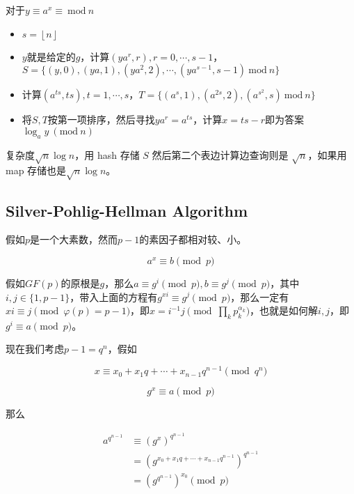 \documentclass{article}
\begin{document}
对于$y\equiv a^x\equiv~\mathrm{mod}~n$

\begin{itemize}
    \item $s=\left\lfloor n\right\rfloor$
    \item $y$就是给定的$g$，计算$(ya^r,r),r=0,\cdots,s-1$，$S=\{(y,0),(ya,1),(ya^2,2),\cdots,(ya^{s-1},s-1)~\mathrm{mod}~n\}$
    \item 计算$(a^{ts},ts),t=1,\cdots,s$，$T=\{(a^s,1),(a^{2s},2),(a^{s^2},s)~\mathrm{mod}~n\}$
    \item 将$S,T$按第一项排序，然后寻找$ya^r=a^{ts}$，计算$x=ts-r$即为答案$\log_a y~(\mathrm{mod}~n)$
\end{itemize}

复杂度$\sqrt{n}\log{n}$，用 hash 存储 $S$ 然后第二个表边计算边查询则是 $\sqrt{n}$，如果用 map 存储也是$\sqrt{n}\log{n}$。

\subsection{Silver-Pohlig-Hellman Algorithm}

假如$p$是一个大素数，然而$p-1$的素因子都相对较、小。

\begin{equation}
    a^x\equiv b\pmod{p}
\end{equation}

假如$GF(p)$的原根是$g$，那么$a\equiv g^i\pmod{p},b\equiv g^j\pmod{p}$，其中$i,j\in\{1,p-1\}$，带入上面的方程有$g^{xi}\equiv g^j\pmod{p}$，那么一定有$xi\equiv j\pmod{\varphi(p)=p-1}$，即$x=i^{-1}j\pmod{\prod_k p_k^{\alpha_k}}$，也就是如何解$i,j$，即$g^i\equiv a\pmod{p}$。

现在我们考虑$p-1=q^n$，假如

\begin{equation}
    x\equiv x_0+x_1q+\cdots+x_{n-1}q^{n-1}\pmod{q^n}
\end{equation}

\begin{equation}
    g^x\equiv a\pmod{p}
\end{equation}

那么


\begin{equation}
    \begin{aligned}
        a^{q^{n-1}}&\equiv(g^x)^{q^{n-1}}\\
        &=(g^{x_0+x_1q+\cdots+x_{n-1}q^{n-1}})^{q^{n-1}}\\
        &=(g^{q^{n-1}})^{x_0}\pmod{p}
    \end{aligned}
\end{equation}
\end{document}

